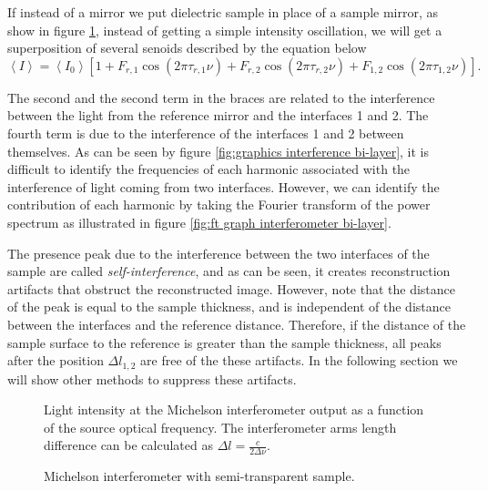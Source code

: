 \documentclass[12pt,twoside,english]{book}
\renewcommand{\~}{\perispomeni}%
\numberwithin{equation}{section}
\numberwithin{figure}{section}
\begin{document}
If instead of a mirror we put dielectric sample in place of a sample mirror, as show in figure \ref{fig:InterferometerBiLayer}, instead of getting a simple intensity oscillation, we will get a superposition of several senoids described by the equation below
\begin{equation}
\left\langle I\right\rangle =\left\langle I_{0}\right\rangle \left[1+F_{r,1}\cos\left(2\pi\tau_{r,1}\nu\right)+F_{r,2}\cos\left(2\pi\tau_{r,2}\nu\right)+F_{1,2}\cos\left(2\pi\tau_{1,2}\nu\right)\right].\end{equation}
 
The second and the second term in the braces are related to the interference between the light from the reference mirror and the interfaces 1 and 2. The fourth term is due to the interference of the interfaces 1 and 2 between themselves. As can be seen by figure \ref{fig:graphics interference bi-layer}, it is difficult to identify the frequencies of each harmonic associated with the interference of light coming from two interfaces. However, we can identify the contribution of each harmonic by taking the Fourier transform of the power spectrum as illustrated in figure \ref{fig:ft graph interferometer bi-layer}.

The presence peak due to the interference between the two interfaces of the sample are called \emph{self-interference}, and as can be seen, it creates reconstruction artifacts that obstruct the reconstructed image. However, note that the distance of the peak is equal to the sample thickness, and is independent of the distance between the interfaces and the reference distance. Therefore, if the distance of the sample surface to the reference is greater than the sample thickness, all peaks after the position $\Delta l_{1,2}$ are free of the these artifacts. In the following section we will show other methods to suppress these artifacts.

%
\begin{figure}[h]
%
\begin{minipage}[t]{0.48\columnwidth}%
\caption{Light intensity at the Michelson interferometer output as a function
of the source optical frequency. The interferometer arms length difference
can be calculated as $\Delta l=\frac{c}{2\Delta\nu}$.\label{fig:freqGraphSimple}}
%
\end{minipage}\hfill{}%
\begin{minipage}[t]{0.48\columnwidth}%
\caption{Michelson interferometer with semi-transparent sample.\label{fig:InterferometerBiLayer}}
%
\end{minipage}
\end{figure}
\end{document}
